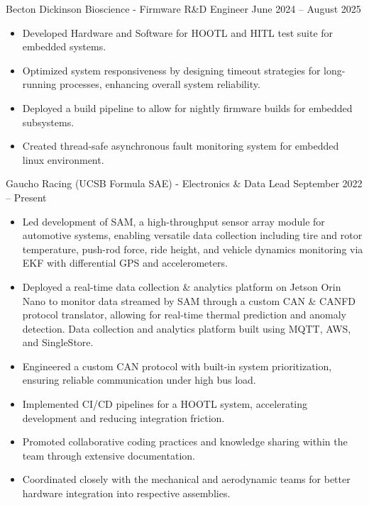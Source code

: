 \documentclass[9pt]{developercv} %
\begin{document}
\vspace{-16 pt}
\begin{entrylist}
    \entry
        {}
        {Becton Dickinson Bioscience - Firmware R\&D Engineer}
        {June 2024 – August 2025}
        {\vspace{-8pt}
        \begin{itemize}[noitemsep,topsep=0pt,parsep=0pt,partopsep=0pt, leftmargin=10pt]
            \item Developed Hardware and Software for HOOTL and HITL test suite for embedded systems.
            \item Optimized system responsiveness by designing timeout strategies for long-running processes, enhancing overall system reliability.
            \item Deployed a build pipeline to allow for nightly firmware builds for embedded subsystems.
            \item Created thread-safe asynchronous fault monitoring system for embedded linux environment.
        \end{itemize}}
    \entry
        {}
        {Gaucho Racing (UCSB Formula SAE) - Electronics \& Data Lead}
        {September 2022 – Present}
        {\vspace{-8pt}
        \begin{itemize}[noitemsep,topsep=0pt,parsep=0pt,partopsep=0pt, leftmargin=10pt]
            \item Led development of SAM, a high-throughput sensor array module for automotive systems, enabling versatile data collection including tire and rotor temperature, push-rod force, ride height, and vehicle dynamics monitoring via EKF with differential GPS and accelerometers.
            \item Deployed a real-time data collection \& analytics platform on Jetson Orin Nano to monitor data streamed by SAM through a custom CAN \& CANFD protocol translator, allowing for real-time thermal prediction and anomaly detection. Data collection and analytics platform built using MQTT, AWS, and SingleStore.
            \item Engineered a custom CAN protocol with built-in system prioritization, ensuring reliable communication under high bus load.
            \item Implemented CI/CD pipelines for a HOOTL system, accelerating development and reducing integration friction.
            \item Promoted collaborative coding practices and knowledge sharing within the team through
            extensive documentation.
            \item Coordinated closely with the mechanical and aerodynamic teams for better hardware integration into respective assemblies.

        \end{itemize}}
\end{entrylist}
\end{document}
